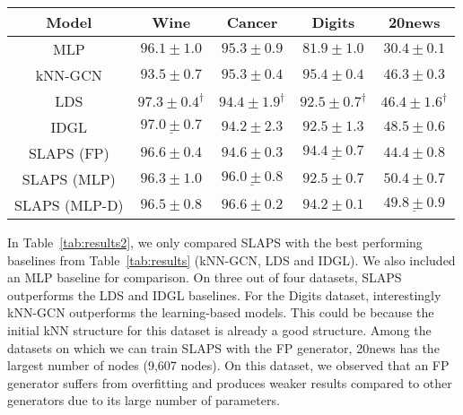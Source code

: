\documentclass{article}
\begin{document}
\begin{table*}[t]
\scriptsize
\caption{Results on classification datasets. $\dagger$ indicates results have been taken from \citet{franceschi2019learning}. Bold and underlined values indicate best and second-best mean performances respectively.}
\label{tab:results2}
\begin{center}
\begin{tabular}{c|cccc}
 Model & Wine & Cancer & Digits & 20news \\ \hline
MLP & $96.1 \pm 1.0$ & $95.3 \pm 0.9$ & $81.9 \pm 1.0$ & $30.4 \pm 0.1$ \\
kNN-GCN & $93.5 \pm 0.7$ & $95.3 \pm 0.4$ & $\bm{95.4} \pm \bm{0.4}$ & $46.3 \pm 0.3$ \\
LDS & $\bm{97.3} \pm \bm{0.4}^\dagger$ & $94.4 \pm 1.9^\dagger$ & $92.5 \pm 0.7^\dagger$ & $46.4 \pm 1.6^\dagger$ \\
IDGL & $\underline{97.0 \pm 0.7}$ & $94.2 \pm 2.3$ & $92.5 \pm 1.3$ & $48.5 \pm 0.6$ \\
\hline
SLAPS (FP) & $96.6 \pm 0.4$ & $94.6 \pm 0.3$& $\underline{94.4 \pm 0.7}$ & $44.4 \pm 0.8$ \\
SLAPS (MLP) & $96.3 \pm 1.0$& $\underline{96.0 \pm 0.8}$& $92.5\pm0.7$ & $\bm{50.4} \pm \bm{0.7}$ \\
SLAPS (MLP-D) & $96.5 \pm 0.8$& $\bm{96.6} \pm \bm{0.2}$& $94.2 \pm 0.1$ & $\underline{49.8 \pm 0.9}$
\end{tabular}
\end{center}
\end{table*}

In Table~\ref{tab:results2}, we only compared SLAPS with the best performing baselines from Table~\ref{tab:results} (kNN-GCN, LDS and IDGL). We also included an MLP baseline for comparison. On three out of four datasets, SLAPS outperforms the LDS and IDGL baselines. For the Digits dataset, interestingly kNN-GCN outperforms the learning-based models. This could be because the initial kNN structure for this dataset is already a good structure. Among the datasets on which we can train SLAPS with the FP generator, 20news has the largest number of nodes (9,607 nodes). On this dataset, we observed that an FP generator suffers from overfitting and produces weaker results compared to other generators due to its large number of parameters.
\end{document}
